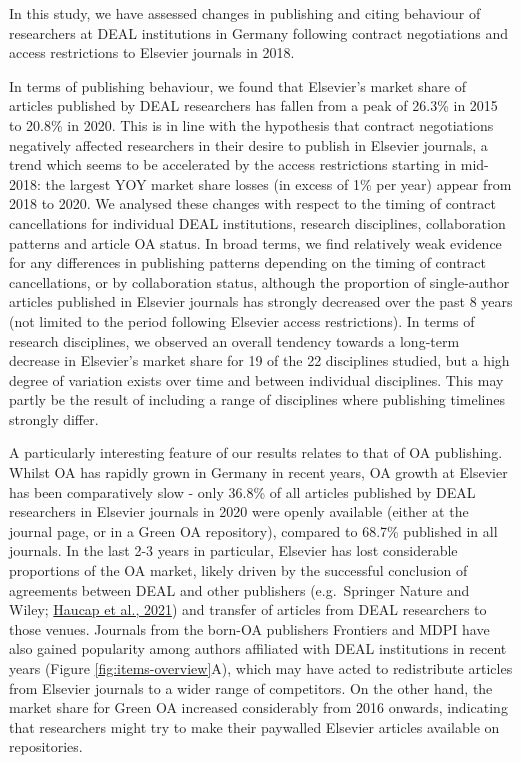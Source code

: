 \documentclass[
]{article}
\begin{document}
In this study, we have assessed changes in publishing and citing behaviour of researchers at DEAL institutions in Germany following contract negotiations and access restrictions to Elsevier journals in 2018.

In terms of publishing behaviour, we found that Elsevier's market share of articles published by DEAL researchers has fallen from a peak of 26.3\% in 2015 to 20.8\% in 2020. This is in line with the hypothesis that contract negotiations negatively affected researchers in their desire to publish in Elsevier journals, a trend which seems to be accelerated by the access restrictions starting in mid-2018: the largest YOY market share losses (in excess of 1\% per year) appear from 2018 to 2020. We analysed these changes with respect to the timing of contract cancellations for individual DEAL institutions, research disciplines, collaboration patterns and article OA status. In broad terms, we find relatively weak evidence for any differences in publishing patterns depending on the timing of contract cancellations, or by collaboration status, although the proportion of single-author articles published in Elsevier journals has strongly decreased over the past 8 years (not limited to the period following Elsevier access restrictions). In terms of research disciplines, we observed an overall tendency towards a long-term decrease in Elsevier's market share for 19 of the 22 disciplines studied, but a high degree of variation exists over time and between individual disciplines. This may partly be the result of including a range of disciplines where publishing timelines strongly differ.

A particularly interesting feature of our results relates to that of OA publishing. Whilst OA has rapidly grown in Germany in recent years, OA growth at Elsevier has been comparatively slow - only 36.8\% of all articles published by DEAL researchers in Elsevier journals in 2020 were openly available (either at the journal page, or in a Green OA repository), compared to 68.7\% published in all journals. In the last 2-3 years in particular, Elsevier has lost considerable proportions of the OA market, likely driven by the successful conclusion of agreements between DEAL and other publishers (e.g.~Springer Nature and Wiley; \href{https://www.cesifo.org/en/publikationen/2021/working-paper/impact-german-deal-competition-academic-publishing-market}{Haucap et al., 2021}) and transfer of articles from DEAL researchers to those venues. Journals from the born-OA publishers Frontiers and MDPI have also gained popularity among authors affiliated with DEAL institutions in recent years (Figure \ref{fig:items-overview}A), which may have acted to redistribute articles from Elsevier journals to a wider range of competitors. On the other hand, the market share for Green OA increased considerably from 2016 onwards, indicating that researchers might try to make their paywalled Elsevier articles available on repositories.
\end{document}
